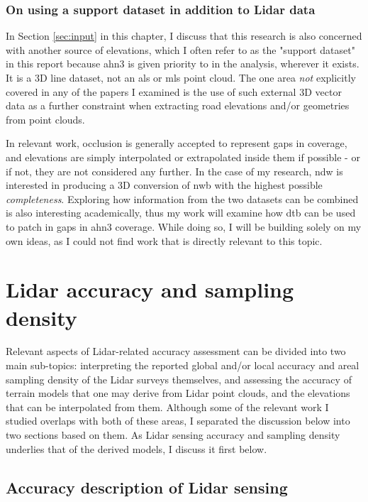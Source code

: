 \subsubsection{On using a support dataset in addition to Lidar data}

In Section \ref{sec:input} in this chapter, I discuss that this research is also concerned with  another source of elevations, which I often refer to as the "support dataset" in this report because \ac{ahn3} is given priority to in the analysis, wherever it exists. It is a 3D line dataset, not an \ac{als} or \ac{mls} point cloud. The one area \textit{not} explicitly covered in any of the papers I examined is the use of such external 3D vector data as a further constraint when extracting road elevations and/or geometries from point clouds.

In relevant work, occlusion is generally accepted to represent gaps in coverage, and elevations are simply interpolated or extrapolated inside them if possible - or if not, they are not considered any further. In the case of my research, \ac{ndw} is interested in producing a 3D conversion of \ac{nwb} with the highest possible \textit{completeness}. Exploring how information from the two datasets can be combined is also interesting academically, thus my work will examine how \ac{dtb} can be used to patch in gaps in \ac{ahn3} coverage. While doing so, I will be building solely on my own ideas, as I could not find work that is directly relevant to this topic.

\section{Lidar accuracy and sampling density}
\label{sec:lidaraccuracy}

Relevant aspects of Lidar-related accuracy assessment can be divided into two main sub-topics: interpreting the reported global and/or local accuracy and areal sampling density of the Lidar surveys themselves, and assessing the accuracy of terrain models that one may derive from Lidar point clouds, and the elevations that can be interpolated from them. Although some of the relevant work I studied overlaps with both of these areas, I separated the discussion below into two sections based on them. As Lidar sensing accuracy and sampling density underlies that of the derived models, I discuss it first below.

\subsection{Accuracy description of Lidar sensing}
\label{sub:lidaraccuracy_sensing}

